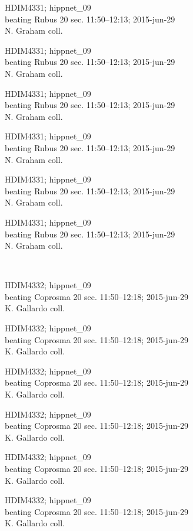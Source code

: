 \documentclass[2pt]{extarticle}
\begin{document}
\noindent
\parbox{0.16\textwidth}{\tiny \raggedright \rule[-0.3\baselineskip]{0pt}{10pt}HDIM4331; hippnet\_09\\ beating Rubus 20 sec. 11:50--12:13; 2015-jun-29\\ N. Graham coll.}
\parbox{0.16\textwidth}{\tiny \raggedright \rule[-0.3\baselineskip]{0pt}{10pt}HDIM4331; hippnet\_09\\ beating Rubus 20 sec. 11:50--12:13; 2015-jun-29\\ N. Graham coll.}
\parbox{0.16\textwidth}{\tiny \raggedright \rule[-0.3\baselineskip]{0pt}{10pt}HDIM4331; hippnet\_09\\ beating Rubus 20 sec. 11:50--12:13; 2015-jun-29\\ N. Graham coll.}
\parbox{0.16\textwidth}{\tiny \raggedright \rule[-0.3\baselineskip]{0pt}{10pt}HDIM4331; hippnet\_09\\ beating Rubus 20 sec. 11:50--12:13; 2015-jun-29\\ N. Graham coll.}
\parbox{0.16\textwidth}{\tiny \raggedright \rule[-0.3\baselineskip]{0pt}{10pt}HDIM4331; hippnet\_09\\ beating Rubus 20 sec. 11:50--12:13; 2015-jun-29\\ N. Graham coll.}
\parbox{0.16\textwidth}{\tiny \raggedright \rule[-0.3\baselineskip]{0pt}{10pt}HDIM4331; hippnet\_09\\ beating Rubus 20 sec. 11:50--12:13; 2015-jun-29\\ N. Graham coll.} \\ 
\vspace{0.001in} 

\noindent
\parbox{0.16\textwidth}{\tiny \raggedright \rule[-0.3\baselineskip]{0pt}{10pt}HDIM4332; hippnet\_09\\ beating Coprosma 20 sec. 11:50--12:18; 2015-jun-29\\ K. Gallardo coll.}
\parbox{0.16\textwidth}{\tiny \raggedright \rule[-0.3\baselineskip]{0pt}{10pt}HDIM4332; hippnet\_09\\ beating Coprosma 20 sec. 11:50--12:18; 2015-jun-29\\ K. Gallardo coll.}
\parbox{0.16\textwidth}{\tiny \raggedright \rule[-0.3\baselineskip]{0pt}{10pt}HDIM4332; hippnet\_09\\ beating Coprosma 20 sec. 11:50--12:18; 2015-jun-29\\ K. Gallardo coll.}
\parbox{0.16\textwidth}{\tiny \raggedright \rule[-0.3\baselineskip]{0pt}{10pt}HDIM4332; hippnet\_09\\ beating Coprosma 20 sec. 11:50--12:18; 2015-jun-29\\ K. Gallardo coll.}
\parbox{0.16\textwidth}{\tiny \raggedright \rule[-0.3\baselineskip]{0pt}{10pt}HDIM4332; hippnet\_09\\ beating Coprosma 20 sec. 11:50--12:18; 2015-jun-29\\ K. Gallardo coll.}
\parbox{0.16\textwidth}{\tiny \raggedright \rule[-0.3\baselineskip]{0pt}{10pt}HDIM4332; hippnet\_09\\ beating Coprosma 20 sec. 11:50--12:18; 2015-jun-29\\ K. Gallardo coll.} \\ 
\vspace{0.001in} 
\end{document}

